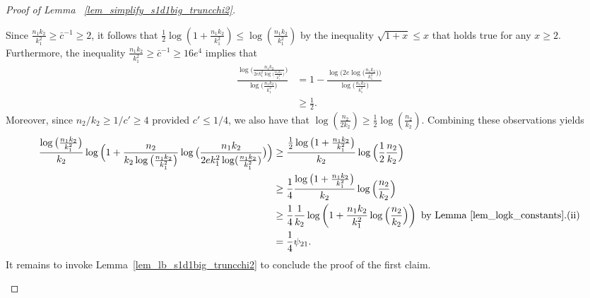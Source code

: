 \documentclass{article}
\begin{document}
\begin{proof}[Proof of Lemma ~\ref{lem_simplify_s1d1big_truncchi2}]
\begin{enumerate}
 Since $\frac{n_1k_2}{k_1^2} \geq \bar{c}^{-1} \geq 2$, it follows that $\frac{1}{2}\log(1 + \frac{n_1k_2}{k_1^2}) \leq \log(\frac{n_1k_2}{k_1^2})$ by the inequality $\sqrt{1+x} \leq x$ that holds true for any $x \geq 2$. Furthermore, the inequality $\frac{n_1k_2}{k_1^2} \geq \bar{c}^{-1} \geq 16e^4$ implies that 
 \begin{align*}
 \frac{\log\Big(\frac{n_1k_2}{2ek_1^2\log\big(\frac{n_1k_2}{k_1^2}\big)}\Big)}{\log \big(\frac{n_1k_2}{k_1^2}\big)} &= 1 - \frac{\log\Big(2e\log\big(\frac{n_1k_2}{k_1^2}\big)\Big)}{\log\big(\frac{n_1k_2}{k_1^2}\big)} \\
 &\geq \frac12.
 \end{align*}
Moreover, since $n_2/k_2 \geq 1/c' \geq 4$ provided $c' \leq 1/4$, we also have that $\log\left(\frac{n_2}{2k_2}\right) \geq \frac{1}{2} \log\left(\frac{n_2}{k_2}\right)$. Combining these observations yields 
\begin{align}
    \frac{\log\big(\frac{n_1k_2}{k_1^2}\big)}{k_2}\log\Big(1 +  \frac{n_2}{k_2\log\big(\frac{n_1k_2}{k_1^2}\big)}\log \big(\frac{n_1k_2}{2ek_1^2\log(\frac{n_1k_2}{k_1^2})}\big)\Big) &\geq \frac{\frac{1}{2}\log\big(1 + \frac{n_1k_2}{k_1^2}\big)}{k_2}\log\Big(
\frac12\frac{n_2}{k_2}\Big)\nonumber\\
& \geq \frac14\frac{\log\big(1 + \frac{n_1k_2}{k_1^2}\big)}{k_2} \log\Big(
\frac{n_2}{k_2}\Big)\nonumber\\
& \geq \frac{1}{4} \frac{1}{k_2} \log\left(1 + \frac{n_1k_2}{k_1^2}\log\Big(
\frac{n_2}{k_2}\Big)\right) \text{ by Lemma~\ref{lem_logk_constants}.(ii)}\nonumber\\
& = \frac{1}{4} \psi_{21}.\label{eq_psi12/4}
\end{align}
It remains to invoke Lemma~\ref{lem_lb_s1d1big_truncchi2} to conclude the proof of the first claim. 


\end{enumerate}
\end{proof}
\end{document}
